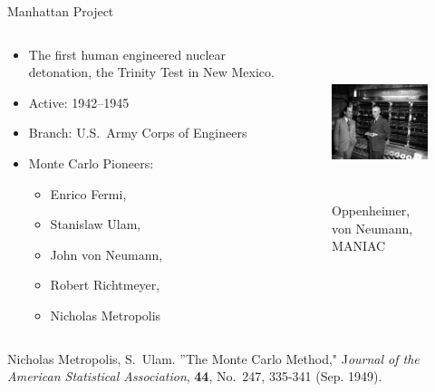 \documentclass[xcolor=x11names,compress]{beamer}
\renewcommand{\(}{\begin{columns}}
\renewcommand{\)}{\end{columns}}
\newcommand{\<}[1]{\begin{column}{#1}}
\renewcommand{\>}{\end{column}}
\begin{document}
\begin{frame}{Manhattan Project}

\begin{columns}
  \begin{column}{0.5\textwidth}
    \begin{itemize}
    \item The first human engineered nuclear detonation, 
    the Trinity Test in New Mexico.
    \item Active: 1942--1945
    \item Branch: U.S.\ Army Corps of Engineers
    \item Monte Carlo Pioneers:
    \begin{itemize}
      \item Enrico Fermi,
      \item Stanislaw Ulam,
      \item John von Neumann, 
      \item Robert Richtmeyer, 
      \item Nicholas Metropolis
    \end{itemize}
    \end{itemize}
  \end{column}
  \begin{column}{0.5\textwidth}
  	\begin{figure}
  	\begin{center}
  		\includegraphics[height=1.75in,clip]{OppieNeumannMANIAC}
  		\caption{Oppenheimer, von Neumann, MANIAC}
	\end{center}
  	\end{figure}
  \end{column}
\end{columns}
\pause
Nicholas Metropolis, S.\ Ulam. ''The Monte Carlo Method," J\textit{ournal of the American Statistical Association}, \textbf{44}, No.\ 247, 335-341 (Sep. 1949).
\end{frame}
\end{document}
